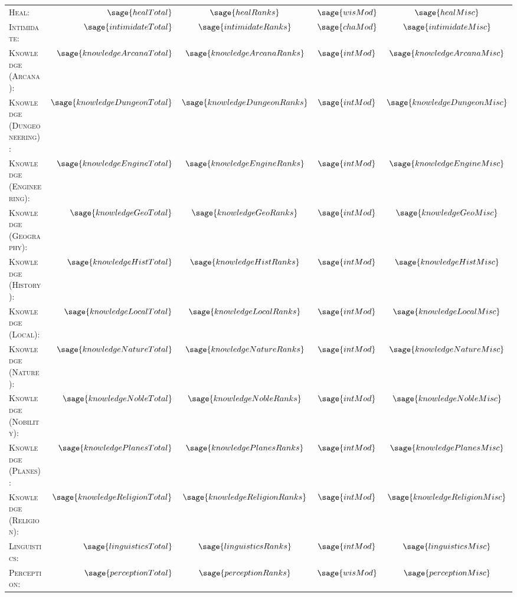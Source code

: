 \documentclass[10pt]{article}
\begin{document}
\begin{tabular}{l r c c c}
		\textsc{Heal:} & \(\sage{healTotal}\) & \(\sage{healRanks}\) & \(\sage{wisMod}\) & \(\sage{healMisc}\) \\
		\textsc{Intimidate:} & \(\sage{intimidateTotal}\) & \(\sage{intimidateRanks}\) & \(\sage{chaMod}\) & \(\sage{intimidateMisc}\) \\
		\textsc{Knowledge (Arcana):} & \(\sage{knowledgeArcanaTotal}\) & \(\sage{knowledgeArcanaRanks}\) & \(\sage{intMod}\) & \(\sage{knowledgeArcanaMisc}\)\\
		\textsc{Knowledge (Dungeoneering):} & \(\sage{knowledgeDungeonTotal}\) & \(\sage{knowledgeDungeonRanks}\) & \(\sage{intMod}\) & \(\sage{knowledgeDungeonMisc}\)\\
		\textsc{Knowledge (Engineering):} & \(\sage{knowledgeEngineTotal}\) & \(\sage{knowledgeEngineRanks}\) & \(\sage{intMod}\) & \(\sage{knowledgeEngineMisc}\)\\
		\textsc{Knowledge (Geography):} & \(\sage{knowledgeGeoTotal}\) & \(\sage{knowledgeGeoRanks}\) & \(\sage{intMod}\) & \(\sage{knowledgeGeoMisc}\)\\
		\textsc{Knowledge (History):} & \(\sage{knowledgeHistTotal}\) & \(\sage{knowledgeHistRanks}\) & \(\sage{intMod}\) & \(\sage{knowledgeHistMisc}\)\\
		\textsc{Knowledge (Local):} & \(\sage{knowledgeLocalTotal}\) & \(\sage{knowledgeLocalRanks}\) & \(\sage{intMod}\) & \(\sage{knowledgeLocalMisc}\)\\
		\textsc{Knowledge (Nature):} & \(\sage{knowledgeNatureTotal}\) & \(\sage{knowledgeNatureRanks}\) & \(\sage{intMod}\) & \(\sage{knowledgeNatureMisc}\)\\
		\textsc{Knowledge (Nobility):} & \(\sage{knowledgeNobleTotal}\) & \(\sage{knowledgeNobleRanks}\) & \(\sage{intMod}\) & \(\sage{knowledgeNobleMisc}\)\\
		\textsc{Knowledge (Planes):} & \(\sage{knowledgePlanesTotal}\) & \(\sage{knowledgePlanesRanks}\) & \(\sage{intMod}\) & \(\sage{knowledgePlanesMisc}\)\\
		\textsc{Knowledge (Religion):} & \(\sage{knowledgeReligionTotal}\) & \(\sage{knowledgeReligionRanks}\) & \(\sage{intMod}\) & \(\sage{knowledgeReligionMisc}\)\\
		\textsc{Linguistics:} & \(\sage{linguisticsTotal}\) & \(\sage{linguisticsRanks}\) & \(\sage{intMod}\) & \(\sage{linguisticsMisc}\) \\
		\textsc{Perception:} & \(\sage{perceptionTotal}\) & \(\sage{perceptionRanks}\) & \(\sage{wisMod}\) & \(\sage{perceptionMisc}\) \\

\end{tabular}
\end{document}
